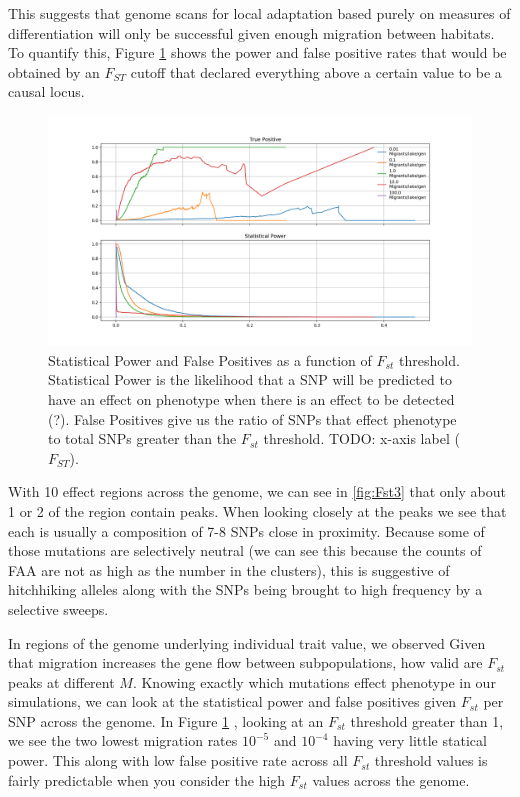 \documentclass{article}
\begin{document}
This suggests that genome scans for local adaptation
based purely on measures of differentiation
will only be successful given enough migration between habitats.
To quantify this, Figure \ref{fig:Power_FP} shows the power and false positive rates
that would be obtained by an $F_{ST}$ cutoff that declared everything above a certain value
to be a causal locus.

\begin{figure}
	\begin{center}
  		\includegraphics[width=0.7\linewidth]{semi_final_plots/TP_SP_semi_final.png}
  		\caption{ 
		Statistical Power and False Positives as a function of $F_{st}$ threshold. 
		Statistical Power is the likelihood that a SNP will be predicted to have an effect on phenotype when there is an effect to be detected (?).
		False Positives give us the ratio of SNPs that effect phenotype to total SNPs greater than the $F_{st}$ threshold.
        TODO: x-axis label ($F_{ST}$).
		}
  		\label{fig:Power_FP}
	\end{center}
\end{figure}

With 10 effect regions across the genome, we can see in \ref{fig:Fst3} that only about 1 or 2 of the region contain peaks. 
When looking closely at the peaks we see that each is usually a composition of 7-8 SNPs close in proximity.
Because some of those mutations are selectively neutral (we can see this because the counts of FAA are not as high as the number in the clusters),
this is suggestive of hitchhiking alleles along with the SNPs being brought to high frequency by a selective sweeps.


In regions of the genome underlying individual trait value, we observed 
Given that migration increases the gene flow between subpopulations, how valid are $F_{st}$ peaks at different $M$. 
Knowing exactly which mutations effect phenotype in our simulations, 
we can look at the statistical power and false positives given $F_{st}$ per SNP across the genome. 
In Figure \ref{fig:Power_FP} , looking at an $F_{st}$ threshold greater than 1, we see the two lowest migration rates $10^{-5}$ and $10^{-4}$ having very little statical power. 
This along with low false positive rate across all $F_{st}$ threshold values is fairly predictable when you consider the high $F_{st}$ values across the genome. 
\end{document}
